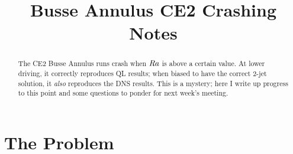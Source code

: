 \documentclass{jfm}
\title{Busse Annulus CE2 Crashing Notes}
\newcommand{\Ray}{\mbox{\textit{Ra}}}  %
\begin{document}
\maketitle

\begin{abstract}
  The CE2 Busse Annulus runs crash when $\Ray$ is above a certain value.
At lower driving, it correctly reproduces QL results; when biased to have the correct 2-jet solution, it \emph{also} reproduces the DNS results.
This is a mystery; here I write up progress to this point and some questions to ponder for next week's meeting.
\end{abstract}

\begin{keywords}
\end{keywords}

\section{The Problem}
\label{sec:intro}
\end{document}
